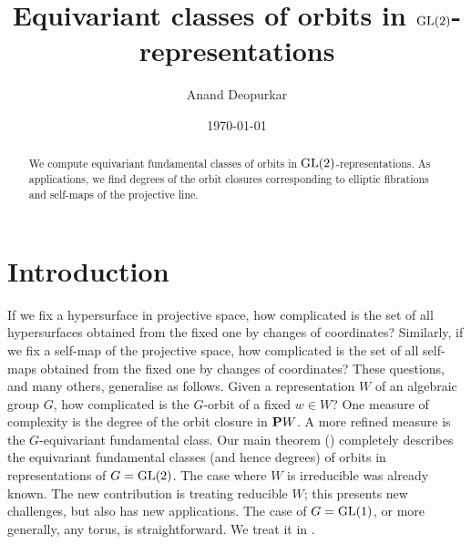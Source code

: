 \documentclass{amsart}
\date{\today}
\begin{document}
\title{Equivariant classes of orbits in \(\GL(2)\)-representations}
\author{Anand Deopurkar}
\address{Mathematical Sciences Institute, Australian National University, Canberra, Australia}

\begin{abstract}
  We compute equivariant fundamental classes of orbits in \(\GL(2)\)-representations.
  As applications, we find degrees of the orbit closures corresponding to elliptic fibrations and self-maps of the projective line.
\end{abstract}

\maketitle

\section{Introduction}
If we fix a hypersurface in projective space, how complicated is the set of all hypersurfaces obtained from the fixed one by changes of coordinates?
Similarly, if we fix a self-map of the projective space, how complicated is the set of all self-maps obtained from the fixed one by changes of coordinates?
These questions, and many others, generalise as follows.
Given a representation \(W\) of an algebraic group \(G\), how complicated is the \(G\)-orbit of a fixed \(w \in W\)?
One measure of complexity is the degree of the orbit closure in \(\P W\).
A more refined measure is the \(G\)-equivariant fundamental class.
Our main theorem () completely describes the equivariant fundamental classes (and hence degrees) of orbits in representations of \(G = \GL(2)\).
The case where \(W\) is irreducible was already known.
The new contribution is treating reducible \(W\); this presents new challenges, but also has new applications.
The case of \(G = \GL(1)\), or more generally, any torus, is straightforward.
We treat it in .
\end{document}

